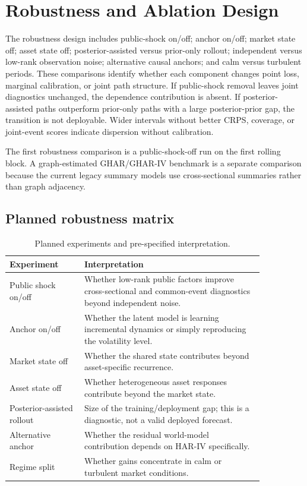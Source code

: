 \documentclass[11pt]{article}
\begin{document}
\section{Robustness and Ablation Design}
The robustness design includes public-shock on/off; anchor on/off; market state off; asset state off; posterior-assisted versus prior-only rollout; independent versus low-rank observation noise; alternative causal anchors; and calm versus turbulent periods. These comparisons identify whether each component changes point loss, marginal calibration, or joint path structure. If public-shock removal leaves joint diagnostics unchanged, the dependence contribution is absent. If posterior-assisted paths outperform prior-only paths with a large posterior-prior gap, the transition is not deployable. Wider intervals without better CRPS, coverage, or joint-event scores indicate dispersion without calibration.

The first robustness comparison is a public-shock-off run on the first rolling block. A graph-estimated GHAR/GHAR-IV benchmark is a separate comparison because the current legacy summary models use cross-sectional summaries rather than graph adjacency.

\subsection{Planned robustness matrix}
\begin{longtable}{p{0.25\linewidth}p{0.60\linewidth}}
\caption{Planned experiments and pre-specified interpretation.}\\
\toprule Experiment & Interpretation\\
\midrule
Public shock on/off & Whether low-rank public factors improve cross-sectional and common-event diagnostics beyond independent noise.\\
Anchor on/off & Whether the latent model is learning incremental dynamics or simply reproducing the volatility level.\\
Market state off & Whether the shared state contributes beyond asset-specific recurrence.\\
Asset state off & Whether heterogeneous asset responses contribute beyond the market state.\\
Posterior-assisted rollout & Size of the training/deployment gap; this is a diagnostic, not a valid deployed forecast.\\
Alternative anchor & Whether the residual world-model contribution depends on HAR-IV specifically.\\
Regime split & Whether gains concentrate in calm or turbulent market conditions.\\
\bottomrule
\end{longtable}
\end{document}
